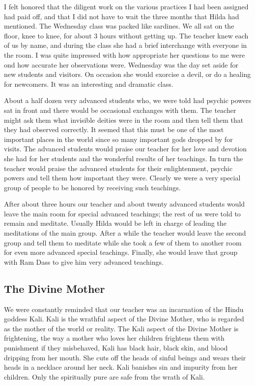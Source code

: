 \documentclass[a5paper,10pt,english]{book}
\begin{document}
\sphinxAtStartPar
I felt honored that the diligent work on the various practices I had
been assigned had paid off, and that I did not have to wait the three
months that Hilda had mentioned. The Wednesday class was packed like
sardines. We all sat on the floor, knee to knee, for about 3 hours
without getting up. The teacher knew each of us by name, and during the
class she had a brief interchange with everyone in the room. I was quite
impressed with how appropriate her questions to me were ond how accurate
her observations were. Wednesday was the day set aside for new students
and visitors. On occasion she would exorcise a devil, or do a healing
for newcomers. It was an interesting and dramatic class.

\sphinxAtStartPar
About a half dozen very advanced students who, we were told had psychic
powers sat in front and there would be occasional exchanges with them.
The teacher might ask them what invisible deities were in the room and
then tell them that they had observed correctly. It seemed that this
must be one of the most important places in the world since so many
important gods dropped by for visits. The advanced students would praise
our teacher for her love and devotion she had for her students and the
wonderful results of her teachings. In turn the teacher would praise the
advanced students for their enlightenment, psychic powers and tell them
how important they were. Clearly we were a very special group of people
to be honored by receiving such teachings.

\sphinxAtStartPar
After about three hours our teacher and about twenty advanced students
would leave the main room for special advanced teachings; the rest of us
were told to remain and meditate. Usually Hilda would be left in charge
of leading the meditations of the main group. After a while the teacher
would leave the second group and tell them to meditate while she took a
few of them to another room for even more advanced special teachings.
Finally, she would leave that group with Ram Dass to give him very
advanced teachings.


\subsection{The Divine Mother}
\label{\detokenize{psychopaths:the-divine-mother}}
\sphinxAtStartPar
We were constantly reminded that our teacher was an incarnation of the
Hindu goddess Kali. Kali is the wrathful aspect of the Divine Mother,
who is regarded as the mother of the world or reality. The Kali aspect
of the Divine Mother is frightening, the way a mother who loves her
children frightens them with punishment if they misbehaved, Kali has
black hair, black skin, and blood dripping from her mouth. She cuts off
the heads of sinful beings and wears their heads in a necklace around
her neck. Kali banishes sin and impurity from her children. Only the
spiritually pure are safe from the wrath of Kali.
\end{document}
